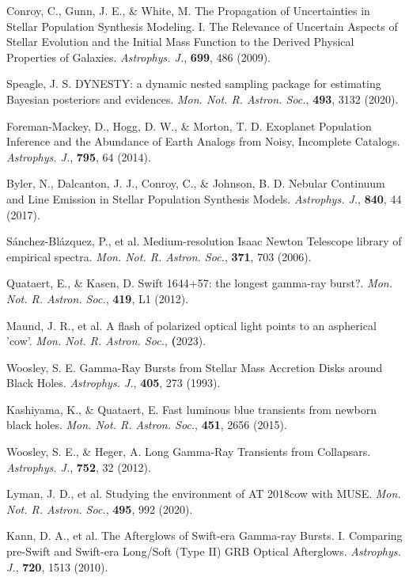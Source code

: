 \documentclass{nature_plusfigure}
\newcommand{\mn}{{Mon. Not. R. Astron. Soc.}}
\newcommand{\mnras}{\mn}
\newcommand{\apj}{{Astrophys. J.}}
\begin{document}
\begin{methods}
\begin{thebibliography}{10}
 Conroy, C., Gunn, J. E., \& White, M. The Propagation of Uncertainties in Stellar Population Synthesis Modeling. I. The Relevance of Uncertain Aspects of Stellar Evolution and the Initial Mass Function to the Derived Physical Properties of Galaxies. \emph{\apj}, \textbf{699}, 486 (2009). 

 Speagle, J. S. DYNESTY: a dynamic nested sampling package for estimating Bayesian posteriors and evidences. \emph{\mnras}, \textbf{493}, 3132 (2020). 

 Foreman-Mackey, D., Hogg, D. W., \& Morton, T. D. Exoplanet Population Inference and the Abundance of Earth Analogs from Noisy, Incomplete Catalogs. \emph{\apj}, \textbf{795}, 64 (2014). 
 
 Byler, N., Dalcanton, J. J., Conroy, C., \& Johnson, B. D. Nebular Continuum and Line Emission in Stellar Population Synthesis Models. \emph{\apj}, \textbf{840}, 44 (2017). 

 Sánchez-Blázquez, P., et al. Medium-resolution Isaac Newton Telescope library of empirical spectra. \emph{\mnras}, \textbf{371}, 703 (2006). 
 

 Quataert, E., \& Kasen, D. Swift 1644+57: the longest gamma-ray burst?. \emph{\mnras}, \textbf{419}, L1 (2012). 

 Maund, J. R., et al. A flash of polarized optical light points to an aspherical 'cow'. \emph{\mnras}, \textbf (2023). 

 Woosley, S. E. Gamma-Ray Bursts from Stellar Mass Accretion Disks around Black Holes. \emph{\apj}, \textbf{405}, 273 (1993). 

 Kashiyama, K., \& Quataert, E. Fast luminous blue transients from newborn black holes. \emph{\mnras}, \textbf{451}, 2656 (2015). 

 Woosley, S. E., \& Heger, A. Long Gamma-Ray Transients from Collapsars. \emph{\apj}, \textbf{752}, 32 (2012). 
 
 Lyman, J. D., et al. Studying the environment of AT 2018cow with MUSE. \emph{\mnras}, \textbf{495}, 992 (2020). 

 
 Kann, D. A., et al. The Afterglows of Swift-era Gamma-ray Bursts. I. Comparing pre-Swift and Swift-era Long/Soft (Type II) GRB Optical Afterglows. \emph{\apj}, \textbf{720}, 1513 (2010). 
 

\end{thebibliography}
\end{methods}
\end{document}
